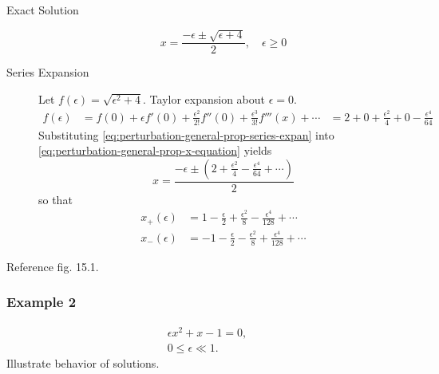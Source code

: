 \documentclass[12pt]{article}
\begin{document}
\begin{description}
\item[Exact Solution]
\begin{equation}
  \label{eq:perturbation-general-prop-x-equation}
  x = \frac{-\epsilon\pm\sqrt{\epsilon+4}}{2},\quad \epsilon\ge0
\end{equation}
\item[Series Expansion] Let $f(\epsilon)=\sqrt{\epsilon^2+4}$. Taylor
  expansion about $\epsilon=0$.
  \begin{equation}
    \label{eq:perturbation-general-prop-series-expan}
    \begin{aligned}
      f(\epsilon) &= f(0)+\epsilon f'(0) + \frac{\epsilon^2}{2!}f''(0) +
      \frac{\epsilon^3}{3!}f'''(x)+\cdots
      &= 2 + 0 + \frac{\epsilon^2}{4}+0-\frac{\epsilon^4}{64}
    \end{aligned}
  \end{equation}
  Substituting \cref{eq:perturbation-general-prop-series-expan} into
  \cref{eq:perturbation-general-prop-x-equation} yields
  \begin{equation*}
    \label{eq:perturbation-general-prop-taylor-x}
    x = \frac{-\epsilon\pm(2+\frac{\epsilon^2}{4}-\frac{\epsilon^4}{64}+\cdots)}{2}
  \end{equation*}
  so that
  \begin{equation}
    \label{eq:perturbation-general-prop-taylor-x-pm}
    \begin{aligned}
      x_+(\epsilon)&=1-\frac{\epsilon}{2} + \frac{\epsilon^2}{8} -
      \frac{\epsilon^4}{128}+\cdots \\
      x_-(\epsilon)&=-1-\frac{\epsilon}{2} - \frac{\epsilon^2}{8} +
      \frac{\epsilon^4}{128}+\cdots
    \end{aligned}\end{equation}
\end{description}
Reference fig. 15.1.

\subsubsection{Example 2}
\begin{equation*}
  \begin{aligned}
    \epsilon x^2+ x-1=0,\\
    0\le\epsilon\ll1.
  \end{aligned}
\end{equation*}
Illustrate behavior of solutions.
\end{document}
